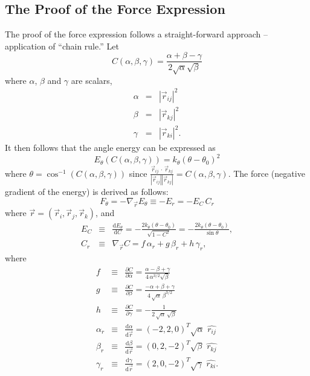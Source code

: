 \documentclass[11pt]{article}
\newcommand{\Vr}[1]{\mbox{$\vec{r}_{#1}$}}
\newcommand{\hatr}[1]{\mbox{$\hat{{r}_{#1}}$}}
\newcommand{\AbsVr}[1]{\mbox{$\left| \vec{r}_{#1} \right| $}}
\begin{document}
\subsection{The Proof of the Force Expression}
The proof of the force expression follows a straight-forward approach
-- application of ``chain rule.'' Let 
\begin{equation}
C(\alpha, \beta, \gamma)=\frac{\alpha + \beta - \gamma}{2
\sqrt{\alpha}\sqrt{\beta}} 
\end{equation}
where $\alpha$, $\beta$ and $\gamma$ are scalars, 
\begin{eqnarray}
\alpha &=&\AbsVr{ij}^2 \\
\beta &=& \AbsVr{kj}^2 \\
\gamma &=& \AbsVr{ki}^2.
\end{eqnarray}
It then follows that the angle energy can be expressed as 
\begin{equation}
E_{\theta}(C(\alpha, \beta, \gamma)) = k_{\theta} (\theta - \theta_{0})^2
\end{equation}
where
$\theta = \cos^{-1}(C(\alpha, \beta, \gamma))$ since $\frac{ \Vr{ij}\,
\cdot \,\Vr{kj}}{ \AbsVr{ij} \AbsVr{kj}} = C(\alpha, \beta, \gamma). $
The force (negative gradient of the energy) is derived as follows:
\begin{equation}
F_{\theta} = - 
\nabla_{\vec{r}}E_{\theta} \equiv - E_r = - E_{C} \,C_r
\end{equation}
where 
$\vec{r} = (\Vr{i},\Vr{j},\Vr{k})$, and
\begin{eqnarray}
E_{C}&\equiv& \frac{\mathrm{d}E_{\theta}}{\mathrm{d}C} 
=  - \frac{2 k_{\theta} (\theta - \theta_0)}{\sqrt{1-C^2}} 
=  - \frac{2 k_{\theta} (\theta - \theta_0)}{\sin\theta}, \\
C_r  &\equiv& 
\nabla_{\vec{r}} C = f \, \alpha_r + 
g \, \beta_r + 
h \, \gamma_r,
\end{eqnarray}
where
\begin{eqnarray}
f &\equiv& \frac{\partial C}{\partial \alpha} =
\frac{\alpha - \beta + \gamma} 
{4\,\alpha^{3/2}\sqrt{\beta}} \\
g &\equiv& \frac{\partial C}{\partial \beta} = 
\frac{-\alpha + \beta + \gamma}
{4\,\sqrt{\alpha}\, \beta^{3/2}} \\
h &\equiv& \frac{\partial C}{\partial \gamma} 
= -\frac{1}{2\, \sqrt{\alpha}\, \sqrt{\beta}} \\
\alpha_{r} &\equiv&  \frac{\mathrm{d}\alpha}{\mathrm{d}\vec{r}} = (-2, 2, 0)^T
\sqrt{\alpha} \,\,\hatr{ij} \\
 \beta_{r} &\equiv& \frac{\mathrm{d}\beta}{\mathrm{d}\vec{r}} = (0, 2, -2)^T 
\sqrt{\beta} \,\,\hatr{kj}\\
\gamma_{r} &\equiv& \frac{\mathrm{d}\gamma}{\mathrm{d}\vec{r}} = (2, 0, -2)^T 
\sqrt{\gamma} \,\,\hatr{ki}.
\end{eqnarray}
\end{document}
